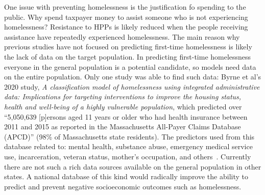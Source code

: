 \documentclass[10pt,letterpaper]{article}
\begin{document}
One issue with preventing homelessness is the justification fo spending to the public. Why spend taxpayer money to assist someone who is not experiencing homelessness? Resistance to HPPs is likely reduced when the people receiving assistance have repeatedly experienced homelessness. The main reason why previous studies have not focused on predicting first-time homelessness is likely the lack of data on the target population. In predicting first-time homelessness everyone in the general population is a potential candidate, so models need data on the entire population. Only one study was able to find such data: Byrne et al's 2020 study, \textit{A classification model of homelessness using integrated administrative data: Implications for targeting interventions to improve the housing status, health and well-being of a highly vulnerable population}, which predicted over ``5,050,639 [p]ersons aged 11 years or older who had health insurance between 2011 and 2015 as reported in the Massachusetts All-Payer Claims Database (APCD)'' (98\% of Massachusetts state residents). The predictors used from this database related to: mental health, substance abuse, emergency medical service use, incarceration, veteran status, mother's occupation, and others~\cite{byrne2020classification}. Currently there are not such a rich data sources available on the general population in other states. A national database of this kind would radically improve the ability to predict and prevent negative socioeconomic outcomes such as homelessness.
\end{document}
